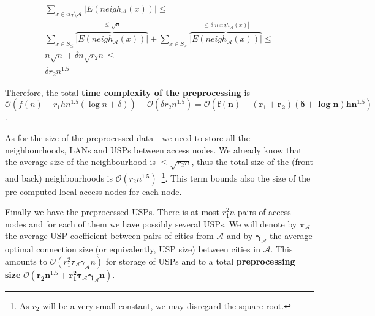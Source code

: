 		\begin{align*}
		\sum_{x \in ct_{T} \setminus \mathcal{A}} |E(neigh_{\mathcal{A}}(x))| \leq \\
		\sum_{x \in S_{\leq}} \overbrace{|E(neigh_{\mathcal{A}}(x))|}^{\leq \sqrt{n}} + 
			\sum_{x \in S_{>}} \overbrace{|E(neigh_{\mathcal{A}}(x))|}^{\leq \delta|neigh_{\mathcal{A}}(x)|} \leq \\
		n \sqrt{n} + \delta n \sqrt{r_{2}n} \leq \\
		\delta r_{2} n^{1.5}
		\end{align*}
		
		\noindent Therefore, the total \textbf{time complexity of the preprocessing} is $\mathcal{O}(f(n) + r_{1}hn^{1.5} (\log n + \delta)) + \mathcal{O}(\delta r_{2} n^{1.5}) = \bm{\mathcal{O}(f(n) + (r_{1} + r_{2}) (\delta + \log n) h n^{1.5})}$.
		
		As for the size of the preprocessed data - we need to store all the neighbourhoods, LANs and USPs between access nodes. We already know that the average size of the neighbourhood is $\leq \sqrt{r_{2}n}$, thus the total size of the (front and back) neighbourhoods is $\mathcal{O}(r_{2} n^{1.5})$~\footnote{As $r_{2}$ will be a very small constant, we may disregard the square root.}. This term bounds also the size of the pre-computed local access nodes for each node.
		
		Finally we have the preprocessed USPs. There is at most $r_{1}^{2}n$ pairs of access nodes and for each of them we have possibly several USPs. We will denote by $\bm{\tau_{\mathcal{A}}}$ the average USP coefficient between pairs of cities from $\mathcal{A}$ and by $\bm{\gamma_{\mathcal{A}}}$ the average optimal connection size (or equivalently, USP size) between cities in $\mathcal{A}$. This amounts to $\mathcal{O}(r_{1}^{2} \tau_{\mathcal{A}} \gamma_{\mathcal{A}} n)$ for storage of USPs and to a total \textbf{preprocessing size} $\bm{\mathcal{O}(r_{2} n^{1.5} + r_{1}^{2} \tau_{\mathcal{A}} \gamma_{\mathcal{A}} n)}$.
		
		\begin{figure}[htb]
		\centering
		\end{figure}
		
